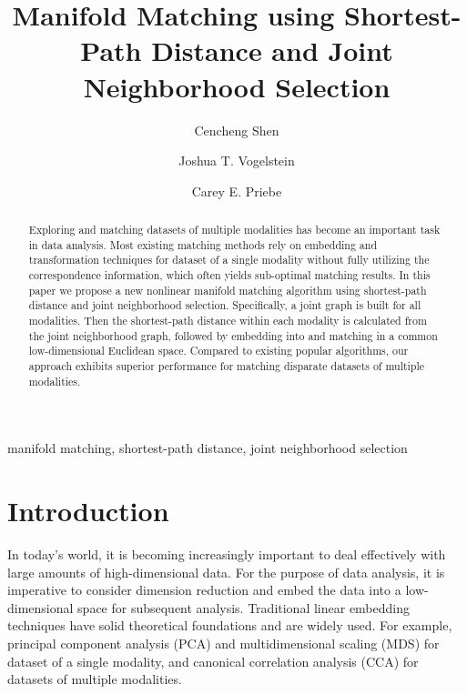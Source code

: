 \documentclass[times,twocolumn,final]{elsarticle}
\begin{document}
\begin{frontmatter}
\title{Manifold Matching using Shortest-Path Distance and Joint Neighborhood Selection}
\author[1,2]{Cencheng Shen}
\author[2,3]{Joshua T. Vogelstein}
\author[2,4]{Carey E. Priebe}

\address[1]{Department of Statistics, Temple University}
\address[2]{Center for Imaging Science, Johns Hopkins University}
\address[3]{Department of Biomedical Engineering and Institute for Computational Medicine, Johns Hopkins University}
\address[4]{Department of Applied Mathematics and Statistics, Johns Hopkins University}

\begin{abstract}
Exploring and matching datasets of multiple modalities has become an important task in data analysis. Most existing matching methods rely on embedding and transformation techniques for dataset of a single modality without fully utilizing the correspondence information, which often yields sub-optimal matching results. In this paper we propose a new nonlinear manifold matching algorithm using shortest-path distance and joint neighborhood selection. Specifically, a joint graph is built for all modalities. Then the shortest-path distance within each modality is calculated from the joint neighborhood graph, followed by embedding into and matching in a common low-dimensional Euclidean space. Compared to existing popular algorithms, our approach exhibits superior performance for matching disparate datasets of multiple modalities. 
\end{abstract}
\begin{keyword}
manifold matching, shortest-path distance, joint neighborhood selection
\end{keyword}
\end{frontmatter}

\section{Introduction}
In today's world, it is becoming increasingly important to deal effectively with large amounts of high-dimensional data. For the purpose of data analysis, it is imperative to consider dimension reduction and embed the data into a low-dimensional space for subsequent analysis. Traditional linear embedding techniques have solid theoretical foundations and are widely used. For example, principal component analysis (PCA) \citep{JolliffePCABook, BishopTipping1999} and multidimensional scaling (MDS) \citep{TorgersonBook, BorgBook, CoxBook} for dataset of a single modality, and canonical correlation analysis (CCA) \citep{Hotelling1936, BachJordan2005} for datasets of multiple modalities. 
\end{document}
